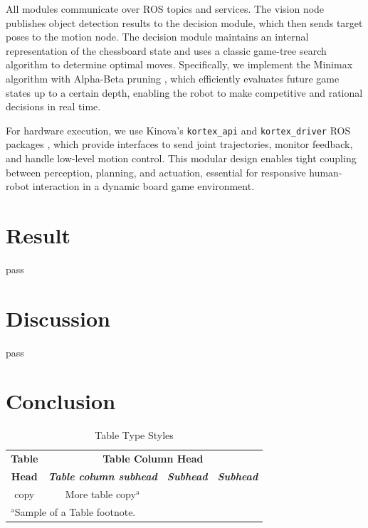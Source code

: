 \documentclass[conference]{IEEEtran}
\begin{document}
All modules communicate over ROS topics and services. The vision node publishes object detection results to the decision module, which then sends target poses to the motion node. The decision module maintains an internal representation of the chessboard state and uses a classic game-tree search algorithm to determine optimal moves. Specifically, we implement the Minimax algorithm with Alpha-Beta pruning \cite{b6}, which efficiently evaluates future game states up to a certain depth, enabling the robot to make competitive and rational decisions in real time.

For hardware execution, we use Kinova’s \texttt{kortex\_api} and \texttt{kortex\_driver} ROS packages \cite{b5}, which provide interfaces to send joint trajectories, monitor feedback, and handle low-level motion control. This modular design enables tight coupling between perception, planning, and actuation, essential for responsive human-robot interaction in a dynamic board game environment.



\section{Result}
pass

\section{Discussion}
pass

\section{Conclusion}
\begin{table}[htbp]
	\caption{Table Type Styles}
	\begin{center}
		\begin{tabular}{|c|c|c|c|}
			\hline
			\textbf{Table}&\multicolumn{3}{|c|}{\textbf{Table Column Head}} \\
			\cline{2-4} 
			\textbf{Head} & \textbf{\textit{Table column subhead}}& \textbf{\textit{Subhead}}& \textbf{\textit{Subhead}} \\
			\hline
			copy& More table copy$^{\mathrm{a}}$& &  \\
			\hline
			\multicolumn{4}{l}{$^{\mathrm{a}}$Sample of a Table footnote.}
		\end{tabular}
		\label{tab1}
	\end{center}
\end{table}
\end{document}
